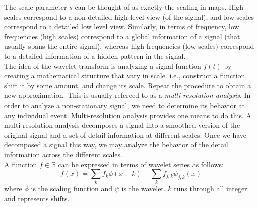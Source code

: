 \documentclass[12pt,english]{report}
\begin{document}
The scale parameter $s$ can be thought of as exactly the scaling in maps. High scales correspond to a non-detailed high level view (of the signal), and low scales correspond to a detailed low level view. Similarly, in terms of frequency, low frequencies (high scales) correspond to a global information of a signal (that usually spans the entire signal), whereas high frequencies (low scales) correspond to a detailed information of a hidden pattern in the signal.\\

The idea of the wavelet transform is analyzing a signal function $f(t)$ by creating a mathematical structure that vary in scale. i.e., construct a function, shift it by some amount, and change its scale. Repeat the procedure to obtain a new approximation. This is usually refereed to as a \emph{multi-resolution analysis}. In order to analyze a non-stationary signal, we need to determine its behavior at any individual event. Multi-resolution analysis provides one means to do this. A multi-resolution analysis decomposes a signal into a smoothed version of the original signal and a set of detail information at different scales. Once we have decomposed a signal this way, we may analyze the behavior of the detail information across the different scales.\\

A function $f \in \mathbb{R}$ can be expressed in terms of wavelet series as follows:
\begin{equation}
f(x)=\sum\limits_{k}{f_k \phi(x-k)}+\sum\limits_{k}{f_{j,k}\psi_{j,k}(x)}
\end{equation}
where $\phi$ is the scaling function and $\psi$ is the wavelet. $k$ runs through all integer and represents shifts.\\
\end{document}
